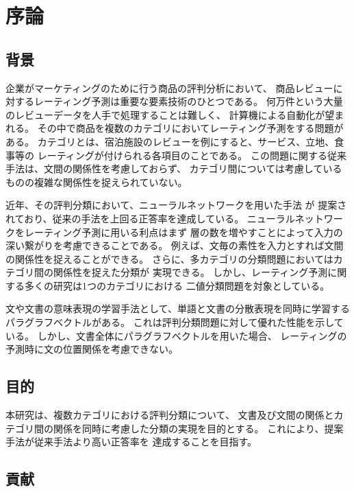 \section{序論} \label{sec:Introduction}

\subsection{背景}

企業がマーケティングのために行う商品の評判分析において、
商品レビューに対するレーティング予測は重要な要素技術のひとつである。
何万件という大量のレビューデータを人手で処理することは難しく、
計算機による自動化が望まれる。
その中で商品を複数のカテゴリにおいてレーティング予測をする問題がある。
カテゴリとは、宿泊施設のレビューを例にすると、サービス、立地、食事等の
レーティングが付けられる各項目のことである。
この問題に関する従来手法\cite{fujitani15}は、文間の関係性を考慮しておらず、
カテゴリ間については考慮しているものの複雑な関係性を捉えられていない。

近年、その評判分類において、ニューラルネットワークを用いた手法
\cite{nal14,rie14,duyu15}が
提案されており、従来の手法を上回る正答率を達成している。
ニューラルネットワークをレーティング予測に用いる利点はまず
層の数を増やすことによって入力の深い繋がりを考慮できることである。
例えば、文毎の素性を入力とすれば文間の関係性を捉えることができる。
さらに、多カテゴリの分類問題においてはカテゴリ間の関係性を捉えた分類が
実現できる。
しかし、レーティング予測に関する多くの研究は1つのカテゴリにおける
二値分類問題を対象としている。

文や文書の意味表現の学習手法として、単語と文書の分散表現を同時に学習する
パラグラフベクトル\cite{quoc14}がある。
これは評判分類問題に対して優れた性能を示している。
しかし、文書全体にパラグラフベクトルを用いた場合、
レーティングの予測時に文の位置関係を考慮できない。


\subsection{目的}

本研究は、複数カテゴリにおける評判分類について、
文書及び文間の関係とカテゴリ間の関係を同時に考慮した分類の実現を目的とする。
これにより、提案手法が従来手法\cite{fujitani15}より高い正答率を
達成することを目指す。


\subsection{貢献}

